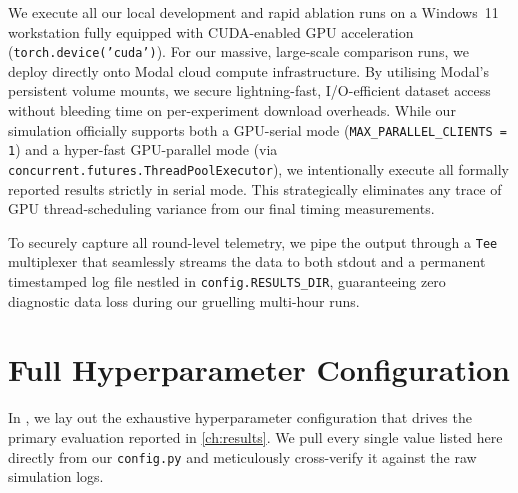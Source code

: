\documentclass[../main.tex]{subfiles}
\begin{document}
We execute all our local development and rapid ablation runs on a Windows~11 workstation fully equipped with CUDA-enabled GPU acceleration (\texttt{torch.device('cuda')}). For our massive, large-scale comparison runs, we deploy directly onto Modal cloud compute infrastructure. By utilising Modal's persistent volume mounts, we secure lightning-fast, I/O-efficient dataset access without bleeding time on per-experiment download overheads. While our simulation officially supports both a GPU-serial mode (\texttt{MAX\_PARALLEL\_CLIENTS = 1}) and a hyper-fast GPU-parallel mode (via \texttt{concurrent.futures.ThreadPoolExecutor}), we intentionally execute all formally reported results strictly in serial mode. This strategically eliminates any trace of GPU thread-scheduling variance from our final timing measurements.

To securely capture all round-level telemetry, we pipe the output through a \texttt{Tee} multiplexer that seamlessly streams the data to both stdout and a permanent timestamped log file nestled in \texttt{config.RESULTS\_DIR}, guaranteeing zero diagnostic data loss during our gruelling multi-hour runs.

\section{Full Hyperparameter Configuration}
\label{sec:exp_hyperparams}

In , we lay out the exhaustive hyperparameter configuration that drives the primary evaluation reported in \cref{ch:results}. We pull every single value listed here directly from our \texttt{config.py} and meticulously cross-verify it against the raw simulation logs.
\end{document}
